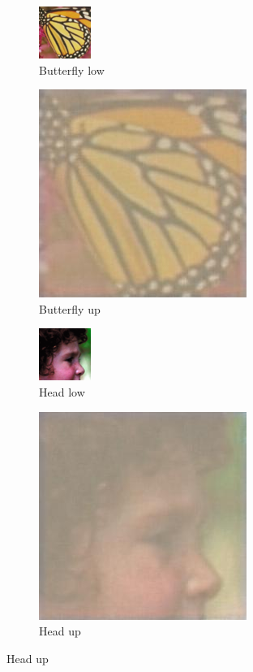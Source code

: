 \documentclass[11pt,twocolumn,twoside,paper=a4]{IEEEtran}
\begin{document}
\begin{figure}[ht]
        \begin{subfigure}{.12\textwidth}
        \centering
        \includegraphics[scale=1]{../images/butterfly_low.jpg}  
        \caption{Butterfly low}
        \label{fig:butterfly_low}
        \end{subfigure} 
        
        \begin{subfigure}{.12\textwidth}
        \centering
        \includegraphics[scale=0.25]{../images/butterfly_up.jpg}  
        \caption{Butterfly up}
        \label{fig:butterfly_up}
        \end{subfigure}

        \begin{subfigure}{.12\textwidth}
        \centering
        \includegraphics[scale=1]{../images/head_low.jpg}  
        \caption{Head low}
        \label{fig:head_low}
        \end{subfigure} 
        
        \begin{subfigure}{.12\textwidth}
        \centering
        \includegraphics[scale=0.25]{../images/head_up.jpg}  
        \caption{Head up}
        \label{fig:head_up}
        \end{subfigure}




\end{figure}
\end{document}
